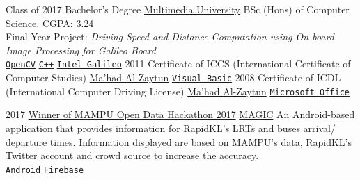 \documentclass[9pt]{developercv} %
\begin{document}
{}

\begin{entrylist}
	\entry
		{Class of 2017}
		{Bachelor's Degree}
		{\href{https://www.mmu.edu.my/}{Multimedia University}}
		{BSc (Hons) of Computer Science. CGPA: 3.24 \\
 		Final Year Project: \textit{Driving Speed and Distance Computation using On-board Image Processing for Galileo Board} \\
			\texttt{\href{https://opencv.org/}{OpenCV}}
				\slashsep
			\texttt{\href{https://isocpp.org/}{C++}}
				\slashsep
			\texttt{\href{https://software.intel.com/en-us/get-started-galileo-windows}{Intel Galileo}}
		}
	\entry
		{2011}
		{Certificate of ICCS (International Certificate of Computer Studies)}
		{\href{http://www.al-zaytun.sch.id/}{Ma'had Al-Zaytun}}
		{\texttt{\href{https://docs.microsoft.com/en-us/dotnet/visual-basic/}{Visual Basic}}}
	\entry
		{2008}
		{Certificate of ICDL (International Computer Driving License)}
		{\href{http://www.al-zaytun.sch.id/}{Ma'had Al-Zaytun}}
		{\texttt{\href{https://www.office.com/}{Microsoft Office}}}
\end{entrylist}




\begin{entrylist}
	\entry
		{2017}
		{\href{https://thegrandchallenge.mdec.my/mampu-open-data-hackathon-2017/}{Winner of MAMPU Open Data Hackathon 2017}}
		{\href{https://mymagic.my/}{MAGIC}}
		{An Android-based application that provides information for RapidKL's LRTs and buses arrival/ departure times. Information displayed are based on MAMPU's data, RapidKL's Twitter account and crowd source to increase the accuracy. \\
 			\texttt{\href{https://developer.android.com/}{Android}}
				\slashsep
			\texttt{\href{https://firebase.google.com/}{Firebase}}
		}
\end{entrylist}

\end{document}
